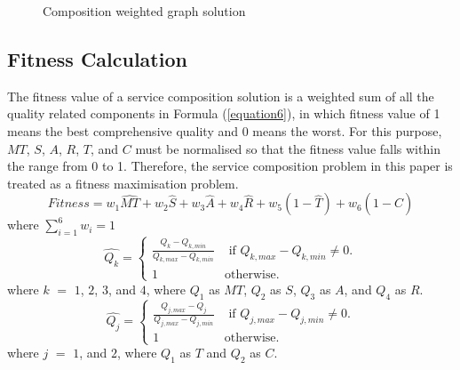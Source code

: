 \documentclass{IEEEtran}
\begin{document}
\begin{figure}[h]
\centering
{}
 \caption{Composition weighted graph solution}
 \label{wscs}
\end{figure}

\subsection{Fitness Calculation}
The fitness value of a service composition solution is a weighted sum of all the quality related components in Formula (\ref{equation6}), in which fitness value of 1 means the best comprehensive quality and 0 means the worst. For this purpose, $MT$, $S$, $A$, $R$, $T$, and $C$ must be normalised so that the fitness value falls within the range from 0 to 1. Therefore, the service composition problem in this paper is treated as a fitness maximisation problem.
\vspace{-0.2cm}
\begin{equation}
\label{equation6}
Fitness = w_1 \hat{MT} + w_2 \hat{S} + w_3 \hat{A} + w_4 \hat{R} + w_5(1 - \hat{T}) + w_6(1 - \hat{C})
\end{equation}
\noindent where $\sum_{i=1}^{6} w_i = 1$
\\
\vspace{-0.2cm}
\begin{equation}
\label{equation7}
\hat{Q_k} = 
\begin{cases}
	\frac{Q_k - Q_{k, min}}{Q_{k, max} - Q_{k, min}} & \text{ if }Q_{k, max} - Q_{k, min} \neq 0.\\
	1 & \mathrm{ otherwise}.
\end{cases}
\end{equation}
\noindent where $k$ $=$ $1$, $2$, $3$, and $4$, where $Q_1$ as $MT$, $Q_2$ as $S$, $Q_3$ as $A$, and $Q_4$ as $R$.
\begin{equation}
\label{equation8}
\hat{Q_j} = 
\begin{cases}
	\frac{Q_{j,max} - Q_j}{Q_{j, max} - Q_{j, min}} & \text{ if }Q_{j, max} - Q_{j, min} \neq 0.\\
	1 & \mathrm{ otherwise}.
\end{cases}
\end{equation}
\noindent where $j$ $=$ $1$, and $2$, where $Q_1$ as $T$ and $Q_2$ as $C$.
\end{document}

